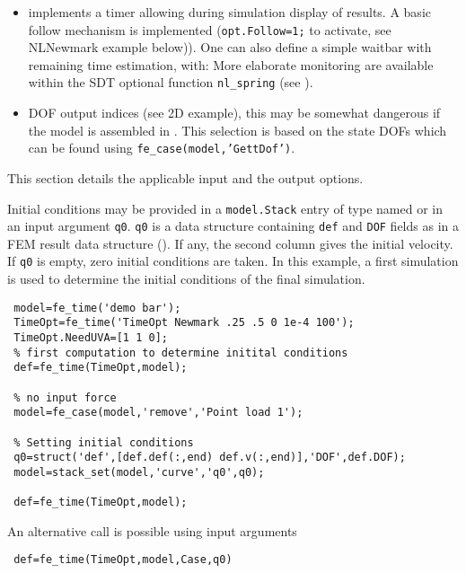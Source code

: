 \begin{itemize}
\item {}   implements a timer allowing during simulation display of results. A basic follow mechanism is implemented ({\tt opt.Follow=1;} to activate, see NLNewmark example below)). One can also define a simple waitbar with remaining time estimation, with: 
More elaborate monitoring are available within the SDT optional function {\tt nl\_spring} (see  ).

\item {}   DOF output indices (see 2D example), this may be somewhat dangerous if the model is assembled in \fetime. This selection is based on the state DOFs which can be found using {\tt fe\_case(model,'GettDof')}.


\end{itemize}



This section details the applicable input and the output options.

Initial conditions may be provided in a {\tt model.Stack} entry of type  named  or in an input argument {\tt q0}. 
{\tt q0} is a data structure containing {\tt def} and {\tt DOF} fields as in a FEM result data structure (). 
If any, the second column gives the initial velocity. If {\tt q0} is empty, zero initial conditions are taken.
In this example, a first simulation is used to determine the initial conditions of the final simulation.

\begin{verbatim}
 model=fe_time('demo bar');
 TimeOpt=fe_time('TimeOpt Newmark .25 .5 0 1e-4 100');
 TimeOpt.NeedUVA=[1 1 0];
 % first computation to determine initital conditions
 def=fe_time(TimeOpt,model); 

 % no input force
 model=fe_case(model,'remove','Point load 1');

 % Setting initial conditions
 q0=struct('def',[def.def(:,end) def.v(:,end)],'DOF',def.DOF);
 model=stack_set(model,'curve','q0',q0);

 def=fe_time(TimeOpt,model); 
\end{verbatim}%


An alternative call is possible using input arguments 
\begin{verbatim}
 def=fe_time(TimeOpt,model,Case,q0) 
\end{verbatim}


